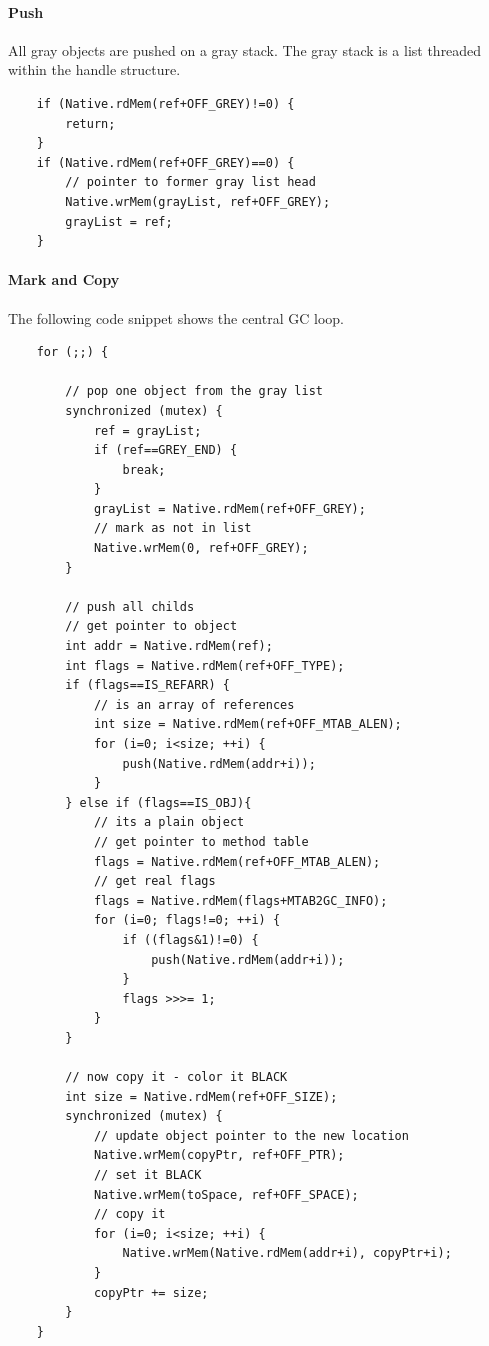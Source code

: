 \paragraph{Push} All gray objects are pushed on a gray stack. The
gray stack is a list threaded within the handle structure.
%
\begin{lstlisting}
    if (Native.rdMem(ref+OFF_GREY)!=0) {
        return;
    }
    if (Native.rdMem(ref+OFF_GREY)==0) {
        // pointer to former gray list head
        Native.wrMem(grayList, ref+OFF_GREY);
        grayList = ref;
    }
\end{lstlisting}

\paragraph{Mark and Copy} The following code snippet shows the
central GC loop.
%
\begin{lstlisting}
    for (;;) {

        // pop one object from the gray list
        synchronized (mutex) {
            ref = grayList;
            if (ref==GREY_END) {
                break;
            }
            grayList = Native.rdMem(ref+OFF_GREY);
            // mark as not in list
            Native.wrMem(0, ref+OFF_GREY);
        }

        // push all childs
        // get pointer to object
        int addr = Native.rdMem(ref);
        int flags = Native.rdMem(ref+OFF_TYPE);
        if (flags==IS_REFARR) {
            // is an array of references
            int size = Native.rdMem(ref+OFF_MTAB_ALEN);
            for (i=0; i<size; ++i) {
                push(Native.rdMem(addr+i));
            }
        } else if (flags==IS_OBJ){
            // its a plain object
            // get pointer to method table
            flags = Native.rdMem(ref+OFF_MTAB_ALEN);
            // get real flags
            flags = Native.rdMem(flags+MTAB2GC_INFO);
            for (i=0; flags!=0; ++i) {
                if ((flags&1)!=0) {
                    push(Native.rdMem(addr+i));
                }
                flags >>>= 1;
            }
        }

        // now copy it - color it BLACK
        int size = Native.rdMem(ref+OFF_SIZE);
        synchronized (mutex) {
            // update object pointer to the new location
            Native.wrMem(copyPtr, ref+OFF_PTR);
            // set it BLACK
            Native.wrMem(toSpace, ref+OFF_SPACE);
            // copy it
            for (i=0; i<size; ++i) {
                Native.wrMem(Native.rdMem(addr+i), copyPtr+i);
            }
            copyPtr += size;
        }
    }
\end{lstlisting}

